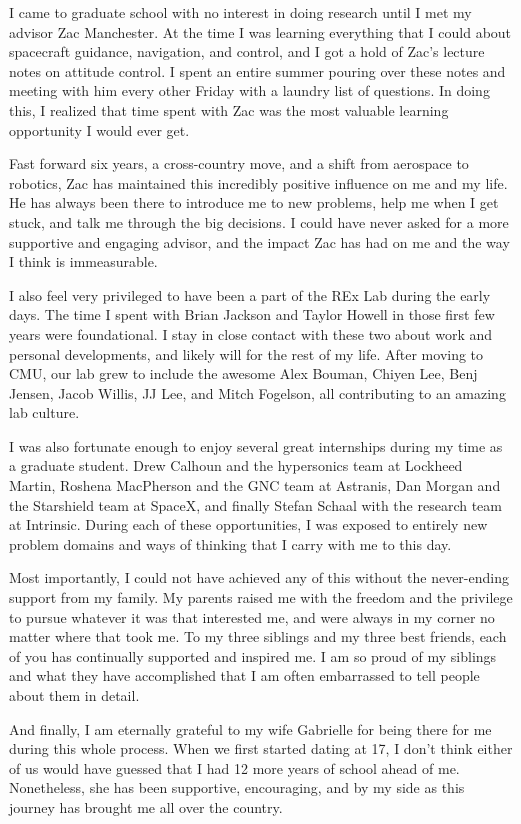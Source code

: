 \documentclass[12pt]{cmuthesis}
\begin{document}
\begin{acknowledgments}
I came to graduate school with no interest in doing research until I met my advisor Zac Manchester. At the time I was learning everything that I could about spacecraft guidance, navigation, and control, and I got a hold of Zac's lecture notes on attitude control. I spent an entire summer pouring over these notes and meeting with him every other Friday with a laundry list of questions. In doing this, I realized that time spent with Zac was the most valuable learning opportunity I would ever get.

Fast forward six years, a cross-country move, and a shift from aerospace to robotics, Zac has maintained this incredibly positive influence on me and my life.  He has always been there to introduce me to new problems, help me when I get stuck, and talk me through the big decisions. I could have never asked for a more supportive and engaging advisor, and the impact Zac has had on me and the way I think is immeasurable. 

I also feel very privileged to have been a part of the REx Lab during the early days. The time I spent with Brian Jackson and Taylor Howell in those first few years were foundational.  I stay in close contact with these two about work and personal developments, and likely will for the rest of my life. After moving to CMU, our lab grew to include the awesome Alex Bouman, Chiyen Lee, Benj Jensen, Jacob Willis, JJ Lee, and Mitch Fogelson, all contributing to an amazing lab culture.

I was also fortunate enough to enjoy several great internships during my time as a graduate student. Drew Calhoun and the hypersonics team at Lockheed Martin, Roshena MacPherson and the GNC team at Astranis, Dan Morgan and the Starshield team at SpaceX, and finally Stefan Schaal with the research team at Intrinsic. During each of these opportunities, I was exposed to entirely new problem domains and ways of thinking that I carry with me to this day.

Most importantly, I could not have achieved any of this without the never-ending support from my family. My parents raised me with the freedom and the privilege to pursue whatever it was that interested me, and were always in my corner no matter where that took me. To my three siblings and my three best friends, each of you has continually supported and inspired me. I am so proud of my siblings and what they have accomplished that I am often embarrassed to tell people about them in detail.

And finally, I am eternally grateful to my wife Gabrielle for being there for me during this whole process. When we first started dating at 17, I don't think either of us would have guessed that I had 12 more years of school ahead of me.  Nonetheless, she has been supportive, encouraging, and by my side as this journey has brought me all over the country. 


\end{acknowledgments}
\restoregeometry
\end{document}
